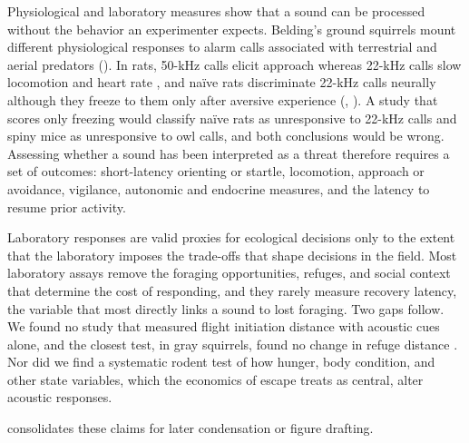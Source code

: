 Physiological and laboratory measures show that a sound can be processed without the behavior an experimenter expects.
Belding's ground squirrels mount different physiological responses to alarm calls associated with terrestrial and aerial predators \citep{Mateo2010} (). In rats, 50-kHz calls elicit approach \citep{WilluhnEtAl2014,OlszynskiEtAl2020} whereas 22-kHz calls slow locomotion and heart rate \citep{OlszynskiEtAl2020}, and naïve rats discriminate 22-kHz calls neurally although they freeze to them only after aversive experience (, ). A study that scores only freezing would classify naïve rats as unresponsive to 22-kHz calls and spiny mice as unresponsive to owl calls, and both conclusions would be wrong. Assessing whether a sound has been interpreted as a threat therefore requires a set of outcomes: short-latency orienting or startle, locomotion, approach or avoidance, vigilance, autonomic and endocrine measures, and the latency to resume prior activity.

Laboratory responses are valid proxies for ecological decisions only to the extent that the laboratory imposes the trade-offs that shape decisions in the field. Most laboratory assays remove the foraging opportunities, refuges, and social context that determine the cost of responding, and they rarely measure recovery latency, the variable that most directly links a sound to lost foraging. Two gaps follow. We found no study that measured flight initiation distance with acoustic cues alone, and the closest test, in gray squirrels, found no change in refuge distance \citep{JayneEtAl2015}. Nor did we find a systematic rodent test of how hunger, body condition, and other state variables, which the economics of escape treats as central, alter acoustic responses.

 consolidates these claims for later condensation or figure drafting.


